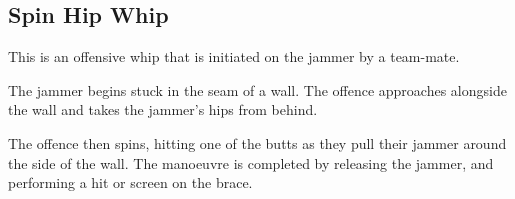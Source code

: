 \subsection*{Spin Hip Whip}
\label{sec:whips/spin_hip_whip} 

This is an offensive whip that is initiated on the jammer by a team-mate.


The jammer begins stuck in the seam of a wall.
The offence approaches alongside the wall and takes the jammer's hips from behind.

The offence then spins, hitting one of the butts as they pull their jammer around the side of the wall. 
The manoeuvre is completed by releasing the jammer, and performing a hit or screen on the brace.  
